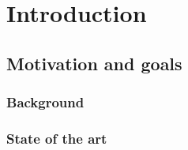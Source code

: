 \chapter{Introduction}

\lipsum %

\section{Motivation and goals}

\lipsum %

\subsection{Background}

\lipsum %

\subsection{State of the art}

\lipsum %
